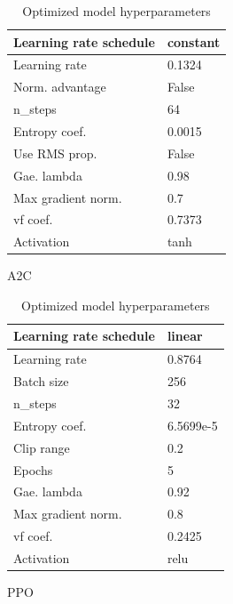 \documentclass{article}
\begin{document}
\begin{table}[H]
	\begin{subtable}[h]{0.45\textwidth}
		\centering
		\begin{tabular}{|l | l|}
		\hline
		Learning rate schedule & constant  \\
		\hline
		Learning rate & 0.1324  \\
		\hline
		Norm. advantage & False  \\
		\hline
		n\_steps & 64  \\
		\hline
		Entropy coef. & 0.0015 \\
		\hline
		Use RMS prop. & False  \\
		\hline
		Gae. lambda & 0.98 \\
		\hline
		Max gradient norm. & 0.7  \\
		\hline
		vf coef. & 0.7373  \\
		\hline
		Activation  & tanh  \\
		\hline
		\end{tabular}
		\caption{A2C}
		\label{tab:a2c}
	\end{subtable}
	\hfill
	\begin{subtable}[h]{0.45\textwidth}
		\centering
		\begin{tabular}{|l | l |}
		\hline
		Learning rate schedule & linear \\
		\hline 
		Learning rate & 0.8764  \\
		\hline
		Batch size & 256  \\
		\hline
		n\_steps & 32  \\
		\hline
		Entropy coef. & 6.5699e-5 \\
		\hline
		Clip range & 0.2  \\
		\hline
		Epochs & 5 \\
		\hline
		Gae. lambda & 0.92 \\
		\hline
		Max gradient norm. &  0.8 \\
		\hline
		vf coef. & 0.2425  \\
		\hline
		Activation & relu \\
		\hline
		\end{tabular}
		\caption{PPO}
		\label{tab:ppo}
	\end{subtable}
	\caption{Optimized model hyperparameters}
	\label{tab:hyp}
\end{table}
\end{document}
